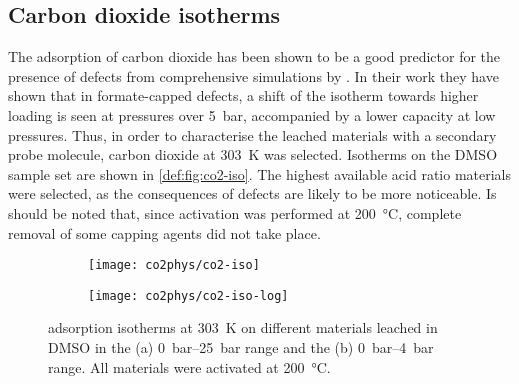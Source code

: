 
\subsection{Carbon dioxide isotherms}\label{def:co2}

The adsorption of carbon dioxide has been shown to be a good 
predictor for the presence of defects from comprehensive simulations
by \citet{thorntonDefectsMetalOrganic2016}.
In their work they have shown that in formate-capped defects, 
a shift of the  isotherm towards
higher loading is seen at pressures over \SI{5}{\bar}, accompanied 
by a lower capacity at low pressures. Thus, in order to characterise
the leached materials with a secondary probe molecule, carbon dioxide
at \SI{303}{\kelvin} was selected. Isotherms on the \gls{DMSO} sample 
set are shown in \autoref{def:fig:co2-iso}. The highest available 
acid ratio materials were selected, as the consequences of defects 
are likely to be more noticeable. Is should be noted that, since
activation was performed at \SI{200}{\degreeCelsius}, complete removal 
of some capping agents did not take place.

\begin{figure}[htb]
    \centering

    \begin{subfigure}{0.5\linewidth}
		\texttt{[image: co2phys/co2-iso]}%
		\caption{}%
		\label{def:fig:co2-iso-reg}
	\end{subfigure}%
	\begin{subfigure}{0.5\linewidth}
		\texttt{[image: co2phys/co2-iso-log]}%
		\caption{}%
		\label{def:fig:co2-iso-log}
	\end{subfigure}%

    \caption{
         adsorption isotherms at \SI{303}{\kelvin} on different
        materials leached in \gls{DMSO} in the (a) \SIrange{0}{25}{\bar} range
        and the (b) \SIrange{0}{4}{\bar} range. All materials were 
        activated at \SI{200}{\degreeCelsius}.
    }\label{def:fig:co2-iso}
\end{figure}

